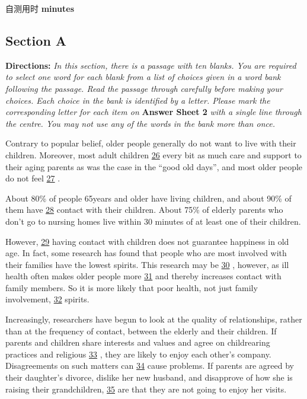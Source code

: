 \documentclass[UTF8,11pt]{ctexart}
\begin{document}
自测用时 \textbf{minutes}


\subsection*{\textbf{Section A}}


\textbf{Directions:}\textit{ In this section, there is a passage with ten blanks. You are required to select one word for each blank} \textit{from a list of choices given in a word bank following the passage. Read the passage through carefully before making} \textit{your choices. Each choice in the bank is identified by a letter. Please mark the corresponding letter for each item on} \textbf{Answer Sheet 2}\textit{ with a single line through the centre. You may not use any of the words in the bank more than once.}


Contrary to popular belief, older people generally do not want to live with their children. Moreover, most adult children \uline{26} every bit as much care and support to their aging parents as was the case in the “good old days”, and most older people do not feel \uline{27} .


About 80\% of people 65years and older have living children, and about 90\% of them have \uline{28} contact with their children. About 75\% of elderly parents who don’t go to nursing homes live within 30 minutes of at least one of their children.


However, \uline{29} having contact with children does not guarantee happiness in old age. In fact, some research has found that people who are most involved with their families have the lowest spirits. This research may be \uline{30} , however, as ill health often makes older people more \uline{31} and thereby increases contact with family members. So it is more likely that poor health, not just family involvement, \uline{32} spirits.


Increasingly, researchers have begun to look at the quality of relationships, rather than at the frequency of contact, between the elderly and their children. If parents and children share interests and values and agree on childrearing practices and religious \uline{33} , they are likely to enjoy each other’s company. Disagreements on such matters can \uline{34} cause problems. If parents are agreed by their daughter’s divorce, dislike her new husband, and disapprove of how she is raising their grandchildren, \uline{35} are that they are not going to enjoy her visits.
\end{document}
